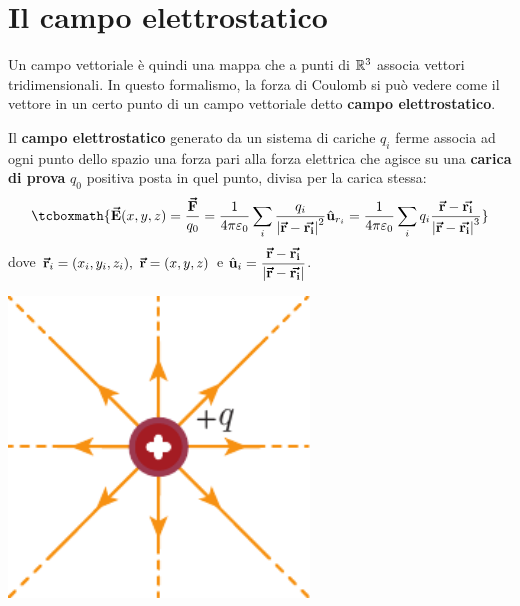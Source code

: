 \section{Il campo elettrostatico}
Un campo vettoriale è quindi una mappa che a punti di $\mathbb{R}^3$ associa vettori tridimensionali.
In questo formalismo, la forza di Coulomb si può vedere come il vettore in un certo punto di un campo vettoriale detto \textbf{campo elettrostatico}.
\begin{define}
	Il \textbf{campo elettrostatico} generato da un sistema di cariche $q_i$ ferme associa ad ogni punto dello spazio una forza pari alla forza elettrica che agisce su una \textbf{carica di prova} $q_0$ positiva posta in quel punto, divisa per la carica stessa:
	\begin{equation}\label{campoelettrostatico}
		\tcboxmath{\vba{E}(x,y,z)=\frac{\vba{F}}{q_0}=\frac{1}{4\pi\epsilon_0}\sum_i \frac{q_i}{\abs{\vba{r}-\vba{r_i}}^2}\vbh{u}_{r_i}=\frac{1}{4\pi\epsilon_0}\sum_i q_i\frac{\vba{r}-\vba{r_i}}{\abs{\vba{r}-\vba{r_i}}^3}}
	\end{equation}
	dove $\vba{r}_i=(x_i,y_i,z_i),\ \vba{r}=(x,y,z)$ e $\hat{\mathbf{u}}_i=\dfrac{\vb*{\va{r}}-\vb*{\va{r_i}}}{\abs{\vb*{\va{r}}-\vb*{\va{r_i}}}}$.
	\begin{center}
		\begin{minipage}{0.45\textwidth}
			\begin{center}
				\includegraphics[width=0.6\textwidth]{images/chp1campocoulomb1.pdf}
			\end{center}
		\end{minipage}
			\hspace{5pt}
		\begin{minipage}{0.45\textwidth}
			\begin{center}

\end{center}
\end{minipage}
\end{center}
\end{define}
